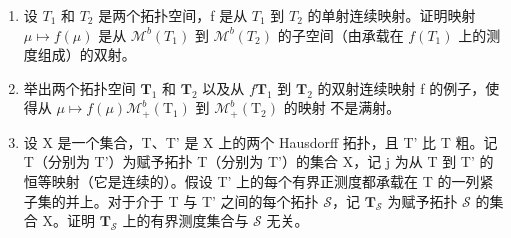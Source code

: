 \exercisesection{}

\begin{enumerate}
\def\labelenumi{\arabic{enumi})}
\item
  设 \(T_{1}\) 和 \(T_{2}\) 是两个拓扑空间，f 是从 \(T_{1}\) 到 \(T_{2}\) 的单射连续映射。证明映射 \(\mu \mapsto f(\mu)\) 是从 \(\mathcal{M}^{b}(T_{1})\) 到 \(\mathcal{M}^{b}(T_{2})\) 的子空间（由承载在 \(f(T_{1})\) 上的测度组成）的双射。
\item
  举出两个拓扑空间 \(\mathbf{T}_1\) 和 \(\mathbf{T}_2\) 以及从 \(f\)\(\mathbf{T}_1\) 到 \(\mathbf{T}_2\) 的双射连续映射 f 的例子，使得从 \(\mu \mapsto f(\mu)\)\(\mathcal{M}_+^b (\mathrm{T}_1)\) 到 \(\mathcal{M}_+^b (\mathrm{T}_2)\) 的映射  不是满射。
\item
  设 X 是一个集合，T、T' 是 X 上的两个 Hausdorff 拓扑，且 T' 比 T 粗。记 T（分别为 T'）为赋予拓扑 T（分别为 T'）的集合 X，记 j 为从 T 到 T' 的恒等映射（它是连续的）。假设 T' 上的每个有界正测度都承载在 T 的一列紧子集的并上。对于介于 T 与 T' 之间的每个拓扑 \(\mathcal{S}\)，记 \(\mathbf{T}_{\mathcal{S}}\) 为赋予拓扑 \(\mathcal{S}\) 的集合 X。证明 \(\mathbf{T}_{\mathcal{S}}\) 上的有界测度集合与 \(\mathcal{S}\) 无关。
\end{enumerate}
\relax{}
